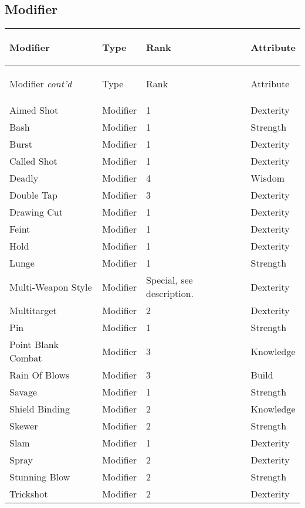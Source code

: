 \documentclass[twoside]{book}
\begin{document}
    

\subsection{Modifier}
    
\begin{longtable}{p{1.25in}lll} 
  Modifier& \begin{turn}{70}{Type}\end{turn}
          & \begin{turn}{70}{Rank}\end{turn}
          & \begin{turn}{70}{Attribute}\end{turn}
          \\
  \hline
  \hline
  \endfirsthead
  Modifier \textit{cont'd}
        & \begin{turn}{70}{Type}\end{turn}
          & \begin{turn}{70}{Rank}\end{turn}
          & \begin{turn}{70}{Attribute}\end{turn}
           \\
  \hline
  \endhead
\raggedright  Aimed Shot& Modifier& 1& Dexterity\tabularnewline
      \raggedright  Bash& Modifier& 1& Strength\tabularnewline
      \raggedright  Burst& Modifier& 1& Dexterity\tabularnewline
      \raggedright  Called Shot& Modifier& 1& Dexterity\tabularnewline
      \raggedright  Deadly& Modifier& 4& Wisdom\tabularnewline
      \raggedright  Double Tap& Modifier& 3& Dexterity\tabularnewline
      \raggedright  Drawing Cut& Modifier& 1& Dexterity\tabularnewline
      \raggedright  Feint& Modifier& 1& Dexterity\tabularnewline
      \raggedright  Hold& Modifier& 1& Dexterity\tabularnewline
      \raggedright  Lunge& Modifier& 1& Strength\tabularnewline
      \raggedright  Multi-Weapon Style& Modifier& Special, see
           description.& Dexterity\tabularnewline
      \raggedright  Multitarget& Modifier& 2& Dexterity\tabularnewline
      \raggedright  Pin& Modifier& 1& Strength\tabularnewline
      \raggedright  Point Blank Combat& Modifier& 3& Knowledge\tabularnewline
      \raggedright  Rain Of Blows& Modifier& 3& Build\tabularnewline
      \raggedright  Savage& Modifier& 1& Strength\tabularnewline
      \raggedright  Shield Binding& Modifier& 2& Knowledge\tabularnewline
      \raggedright  Skewer& Modifier& 2& Strength\tabularnewline
      \raggedright  Slam& Modifier& 1& Dexterity\tabularnewline
      \raggedright  Spray& Modifier& 2& Dexterity\tabularnewline
      \raggedright  Stunning Blow& Modifier& 2& Strength\tabularnewline
      \raggedright  Trickshot& Modifier& 2& Dexterity\tabularnewline
      
\end{longtable}
    
\end{document}
